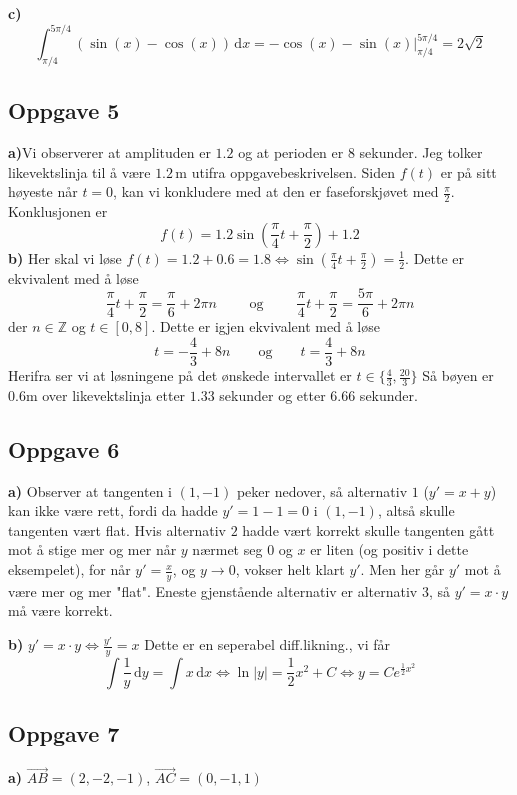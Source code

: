 \documentclass[12pt]{article}
\begin{document}
\begin{flushleft}
		\textbf{c)} $$\int_{\pi/4}^{5\pi/4} \left(\sin(x) - \cos(x)\right) \, \text{d}x = -\cos(x)-\sin(x)\bigg\vert_{\pi/4}^{5\pi/4} = 2\sqrt{2}$$
		
		\subsection{Oppgave 5}
		\textbf{a)}Vi observerer at amplituden er $1.2$ og at perioden er $8$ sekunder. Jeg tolker likevektslinja til å være $1.2 \, \text{m}$ utifra oppgavebeskrivelsen. Siden $f(t)$ er på sitt høyeste når $t=0$, kan vi konkludere med at den er faseforskjøvet med $\frac{\pi}{2}$. Konklusjonen er $$f(t)=1.2\sin\left(\frac{\pi}{4}t + \frac{\pi}{2} \right) + 1.2$$
		\textbf{b)} Her skal vi løse $f(t)=1.2+0.6=1.8 \Longleftrightarrow \sin\left(\frac\pi4 t + \frac\pi2 \right)=\frac12$. Dette er ekvivalent med å løse $$\frac\pi4 t + \frac\pi2 = \frac\pi6 + 2\pi n \qquad \text{ og } \qquad \frac\pi4 t + \frac\pi2 = \frac{5\pi}{6} + 2\pi n$$ der $n \in \mathbb{Z}$ og $t \in [0,8]$. Dette er igjen ekvivalent med å løse $$t=-\frac{4}{3} + 8n \qquad \text{og} \qquad t=\frac43 + 8n$$ Herifra ser vi at løsningene på det ønskede intervallet er $t\in\{\frac43, \frac{20}{3}\}$ Så bøyen er 0.6m over likevektslinja etter $1.33$ sekunder og etter $6.66$ sekunder.
		
		\subsection{Oppgave 6}
		\textbf{a)} Observer at tangenten i $(1,-1)$ peker nedover, så alternativ $1$ ($y'=x+y$) kan ikke være rett, fordi da hadde $y'=1-1=0$ i $(1,-1)$, altså skulle tangenten vært flat. Hvis alternativ $2$ hadde vært korrekt skulle tangenten gått mot å stige mer og mer når $y$ nærmet seg $0$ og $x$ er liten (og positiv i dette eksempelet), for når $y'=\frac{x}{y}$, og $y\to 0$, vokser helt klart $y'$. Men her går $y'$ mot å være mer og mer "flat". Eneste gjenstående alternativ er alternativ 3, så $y'=x\cdot y$ må være korrekt. \newline
		
		\textbf{b)} $y'=x\cdot y \Longleftrightarrow \frac{y'}{y} = x$ Dette er en seperabel diff.likning., vi får $$\int \frac{1}{y} \, \text{d}y = \int x \, \text{d}x \Longleftrightarrow \ln|y| = \frac{1}{2}x^2 + C \Longleftrightarrow y = Ce^{\frac12 x^2}$$
		
		\subsection{Oppgave 7}
		\textbf{a)} $\overrightarrow{AB} = (2,-2,-1)$, $\overrightarrow{AC}=(0,-1,1)$ \newline
		

\end{flushleft}
\end{document}
